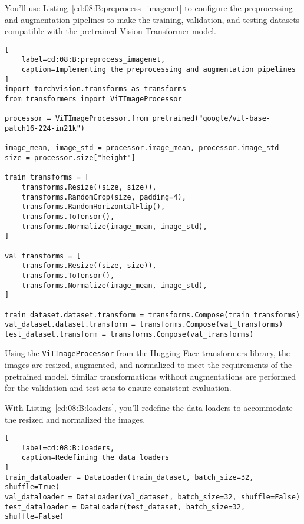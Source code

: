 You'll use Listing~\ref{cd:08:B:preprocess_imagenet} to configure the preprocessing and augmentation pipelines to make the training, validation, and testing datasets compatible with the pretrained Vision Transformer model. 
\begin{lstlisting}[
    label=cd:08:B:preprocess_imagenet,
    caption=Implementing the preprocessing and augmentation pipelines
]
import torchvision.transforms as transforms
from transformers import ViTImageProcessor

processor = ViTImageProcessor.from_pretrained("google/vit-base-patch16-224-in21k")

image_mean, image_std = processor.image_mean, processor.image_std
size = processor.size["height"]

train_transforms = [
    transforms.Resize((size, size)),
    transforms.RandomCrop(size, padding=4),
    transforms.RandomHorizontalFlip(),
    transforms.ToTensor(),
    transforms.Normalize(image_mean, image_std),
]

val_transforms = [
    transforms.Resize((size, size)),
    transforms.ToTensor(),
    transforms.Normalize(image_mean, image_std),
]

train_dataset.dataset.transform = transforms.Compose(train_transforms)
val_dataset.dataset.transform = transforms.Compose(val_transforms)
test_dataset.transform = transforms.Compose(val_transforms)
\end{lstlisting}
Using the \lstinline{ViTImageProcessor} from the Hugging Face transformers library, the images are resized, augmented, and normalized to meet the requirements of the pretrained model.
Similar transformations without augmentations are  performed for the validation and test sets to ensure consistent evaluation.

With Listing~\ref{cd:08:B:loaders}, you'll redefine the data loaders to accommodate the resized and normalized the images.
\begin{lstlisting}[
    label=cd:08:B:loaders,
    caption=Redefining the data loaders
]
train_dataloader = DataLoader(train_dataset, batch_size=32, shuffle=True)
val_dataloader = DataLoader(val_dataset, batch_size=32, shuffle=False)
test_dataloader = DataLoader(test_dataset, batch_size=32, shuffle=False)
\end{lstlisting}

